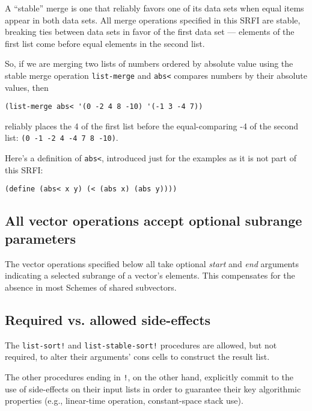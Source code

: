 A ``stable'' merge is one that reliably favors one of its data sets when
equal items appear in both data sets. All merge operations specified in
this SRFI are stable, breaking ties between data sets in favor of the
first data set --- elements of the first list come before equal elements
in the second list.

So, if we are merging two lists of numbers ordered by absolute value
using the stable merge operation \texttt{list-merge} and
\texttt{abs\textless{}} compares numbers by their absolute values, then

\begin{verbatim}
(list-merge abs< '(0 -2 4 8 -10) '(-1 3 -4 7))
\end{verbatim}

reliably places the 4 of the first list before the equal-comparing -4 of
the second list: \texttt{(0\ -1\ -2\ 4\ -4\ 7\ 8\ -10)}.

Here's a definition of \texttt{abs\textless{}}, introduced just for the
examples as it is not part of this SRFI:

\begin{verbatim}
(define (abs< x y) (< (abs x) (abs y))))
\end{verbatim}

\subsection{All vector operations accept optional subrange
parameters}\label{Allvectoroperationsacceptoptionalsubrangeparameters}

The vector operations specified below all take optional \emph{start} and
\emph{end} arguments indicating a selected subrange of a vector's
elements. This compensates for the absence in most Schemes of shared
subvectors.

\subsection{Required vs. allowed
side-effects}\label{Requiredvs.allowedside-effects}

The \texttt{list-sort!} and \texttt{list-stable-sort!} procedures are
allowed, but not required, to alter their arguments' cons cells to
construct the result list.

The other procedures ending in \texttt{!}, on the other hand, explicitly
commit to the use of side-effects on their input lists in order to
guarantee their key algorithmic properties (e.g., linear-time operation,
constant-space stack use).

